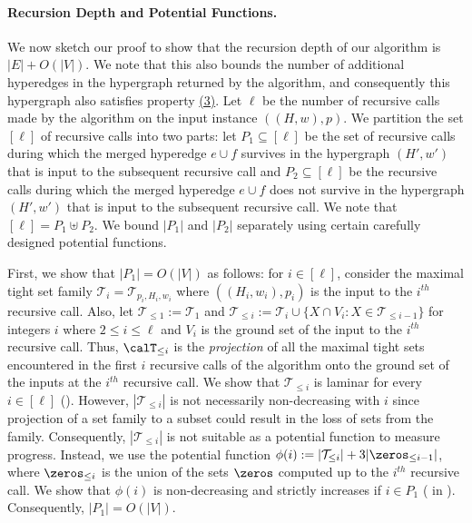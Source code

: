 \paragraph{Recursion Depth and Potential Functions.} We now sketch our proof to show that the recursion depth of our algorithm is $|E|+O(|V|)$. We note that this also bounds the number of additional hyperedges in the hypergraph returned by the algorithm, and consequently this hypergraph also satisfies property \hyperlink{WeakToStrong(3)}{(3)}. Let $\ell$ be the number of recursive calls made by the algorithm on the input instance $((H, w), p)$. 
We partition 
the set $[\ell]$ of recursive calls into two parts: let $P_1\subseteq [\ell]$ be the set of recursive calls during which 
the merged hyperedge $e\cup f$ survives in the hypergraph $(H', w')$ that is input to the subsequent recursive call and 
$P_2\subseteq [\ell]$ be the recursive calls during which 
the merged hyperedge $e\cup f$ does not survive in the hypergraph $(H', w')$ that is input to the subsequent recursive call. 
We note that $[\ell]=P_1\uplus P_2$. We bound $|P_1|$ and $|P_2|$ separately using certain carefully designed potential functions.

First, we show that $|P_1|=O(|V|)$ as follows: for $i\in [\ell]$, consider the maximal tight set family $\mathcal{T}_i=\mathcal{T}_{p_i, H_i, w_i}$ where $((H_i, w_i), p_i)$ is the input to the $i^{th}$ recursive call. Also, let $\mathcal{T}_{\le 1}:=\mathcal{T}_1$ and $\mathcal{T}_{\le i}:=\mathcal{T}_{i}\cup \{X\cap V_i: X\in \mathcal{T}_{\le i-1}\}$ for integers $i$ where $2 \le i\le \ell$ and $V_i$ is the ground set of the input to the $i^{th}$ recursive call. Thus, $\calT_{\leq i}$ is the \emph{projection} of all the maximal tight sets encountered in the first $i$ recursive calls of the algorithm onto the ground set of the inputs at the $i^{th}$ recursive call. We show that $\mathcal{T}_{\le i}$ is laminar for every $i\in [\ell]$ (). 
However, $|\mathcal{T}_{\le i}|$ is not necessarily non-decreasing with $i$ since projection of a set family to a subset could result in the loss of sets from the family. Consequently, $|\mathcal{T}_{\le i}|$ is not suitable as a potential function to measure progress. Instead, we use the potential function $\phi(i):=|\mathcal{T}_{\le i}|+3|\zeros_{\le i-1}|$, where $\zeros_{\le i}$ is the union of the sets $\zeros$ computed up to the $i^{th}$ recursive call. We show that $\phi(i)$ is non-decreasing and strictly increases if $i\in P_1$ ( in ). Consequently, $|P_1|=O(|V|)$.

